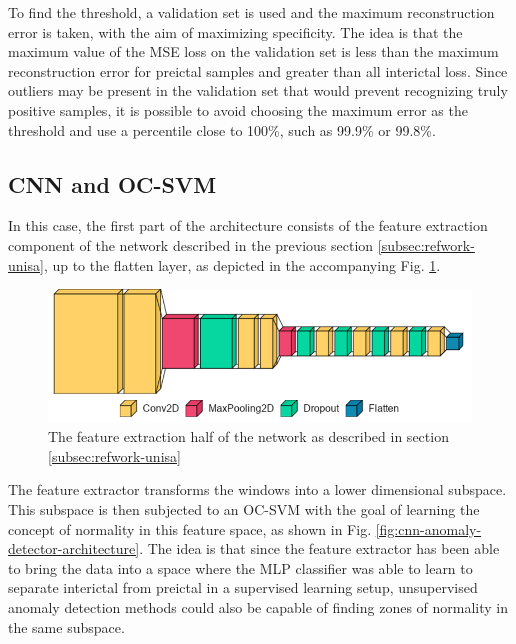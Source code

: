 To find the threshold, a validation set is used and the maximum reconstruction error is taken, with the aim of maximizing specificity. The idea is that the maximum value of the \gls{MSE} loss on the validation set is less than the maximum reconstruction error for preictal samples and greater than all interictal loss. Since outliers may be present in the validation set that would prevent recognizing truly positive samples, it is possible to avoid choosing the maximum error as the threshold and use a percentile close to 100\%, such as 99.9\% or 99.8\%.

\subsection{CNN and OC-SVM} \label{subsec:cnn}
In this case, the first part of the architecture consists of the feature extraction component of the network described in the previous section \ref{subsec:refwork-unisa}, up to the flatten layer, as depicted in the accompanying Fig. \ref{fig:cnn-feature-extractor}.

\begin{figure}[ht]
    \centering
    \includegraphics[width=1.0\textwidth]{images/Contribution/cnn-feature-extractor.png}
    \caption{The feature extraction half of the network as described in section \ref{subsec:refwork-unisa}}
    \label{fig:cnn-feature-extractor}
\end{figure}

The feature extractor transforms the windows into a lower dimensional subspace. This subspace is then subjected to an \gls{OC-SVM} with the goal of learning the concept of normality in this feature space, as shown in Fig. \ref{fig:cnn-anomaly-detector-architecture}. The idea is that since the feature extractor has been able to bring the data into a space where the \gls{MLP} classifier was able to learn to separate interictal from preictal in a supervised learning setup, unsupervised anomaly detection methods could also be capable of finding zones of normality in the same subspace.

